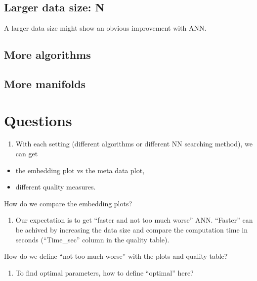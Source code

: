 \documentclass[11pt,a4paper,]{article}
\providecommand{\tightlist}{%
  \setlength{\itemsep}{0pt}\setlength{\parskip}{0pt}}
\begin{document}
\hypertarget{larger-data-size-n}{%
\subsection{Larger data size: N}\label{larger-data-size-n}}

A larger data size might show an obvious improvement with ANN.

\hypertarget{more-algorithms}{%
\subsection{More algorithms}\label{more-algorithms}}

\hypertarget{more-manifolds}{%
\subsection{More manifolds}\label{more-manifolds}}

\hypertarget{questions}{%
\section{Questions}\label{questions}}

\begin{enumerate}
\def\labelenumi{\arabic{enumi})}
\tightlist
\item
  With each setting (different algorithms or different NN searching method), we can get
\end{enumerate}

\begin{itemize}
\item
  the embedding plot vs the meta data plot,
\item
  different quality measures.
\end{itemize}

How do we compare the embedding plots?

\begin{enumerate}
\def\labelenumi{\arabic{enumi})}
\setcounter{enumi}{1}
\tightlist
\item
  Our expectation is to get ``faster and not too much worse'' ANN. ``Faster'' can be achived by increasing the data size and compare the computation time in seconds (``Time\_sec'' column in the quality table).
\end{enumerate}

How do we define ``not too much worse'' with the plots and quality table?

\begin{enumerate}
\def\labelenumi{\arabic{enumi})}
\setcounter{enumi}{2}
\tightlist
\item
  To find optimal parameters, how to define ``optimal'' here?
\end{enumerate}
\end{document}
